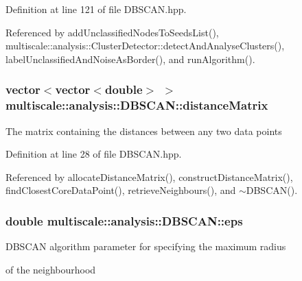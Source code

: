 Definition at line 121 of file D\-B\-S\-C\-A\-N.\-hpp.



Referenced by add\-Unclassified\-Nodes\-To\-Seeds\-List(), multiscale\-::analysis\-::\-Cluster\-Detector\-::detect\-And\-Analyse\-Clusters(), label\-Unclassified\-And\-Noise\-As\-Border(), and run\-Algorithm().

\hypertarget{classmultiscale_1_1analysis_1_1DBSCAN_a863a8b90ff30d401795264a246a09147}{
\subsubsection[{distance\-Matrix}]{\setlength{\rightskip}{0pt plus 5cm}vector$<$vector$<$double$>$ $>$ multiscale\-::analysis\-::\-D\-B\-S\-C\-A\-N\-::distance\-Matrix\hspace{0.3cm}{\ttfamily [private]}}}\label{classmultiscale_1_1analysis_1_1DBSCAN_a863a8b90ff30d401795264a246a09147}
The matrix containing the distances between any two data points 

Definition at line 28 of file D\-B\-S\-C\-A\-N.\-hpp.



Referenced by allocate\-Distance\-Matrix(), construct\-Distance\-Matrix(), find\-Closest\-Core\-Data\-Point(), retrieve\-Neighbours(), and $\sim$\-D\-B\-S\-C\-A\-N().

\hypertarget{classmultiscale_1_1analysis_1_1DBSCAN_a8d68cd84561cbb06bd138f8edf340b9f}{
\subsubsection[{eps}]{\setlength{\rightskip}{0pt plus 5cm}double multiscale\-::analysis\-::\-D\-B\-S\-C\-A\-N\-::eps\hspace{0.3cm}{\ttfamily [private]}}}\label{classmultiscale_1_1analysis_1_1DBSCAN_a8d68cd84561cbb06bd138f8edf340b9f}
\begin{DoxyVerb}                              DBSCAN algorithm parameter for specifying the maximum radius
\end{DoxyVerb}
 of the neighbourhood 


